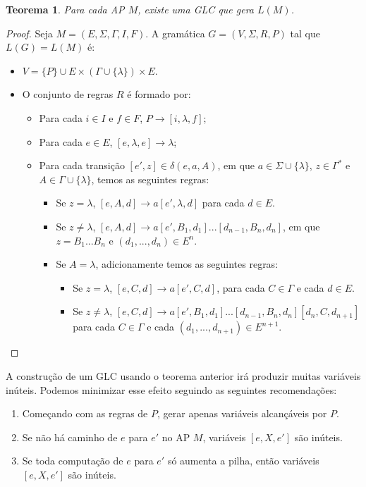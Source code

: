 \documentclass[a4paper]{article}
\newtheorem{Theorem}{Teorema}
\theoremstyle{definition}
\begin{document}
  
  \begin{Theorem}\label{thmglcap}
    Para cada AP $M$, existe uma GLC que gera $L(M)$.
  \end{Theorem}
  \begin{proof}
    Seja $M = (E,\Sigma,\Gamma,I,F)$. A gramática $G = (V,\Sigma,R,P)$ tal que
    $L(G) = L(M)$ é:
    \begin{itemize}
      \item $V = \{P\} \cup E \times (\Gamma \cup \{\lambda\}) \times E$.
      \item O conjunto de regras $R$ é formado por:
        \begin{itemize}
           \item Para cada $i \in I$ e $f \in F$, $P \to [i,\lambda,f]$;
           \item Para cada $e\in E$, $[e,\lambda,e] \to \lambda$;
           \item Para cada transição $[e',z] \in \delta(e, a, A)$, em que $a\in
             \Sigma\cup\{\lambda\}$, $z\in \Gamma^*$ e $A \in \Gamma \cup
             \{\lambda\}$, temos as seguintes regras:
             \begin{itemize}
               \item Se $z = \lambda$, $[e,A,d] \to a[e',\lambda,d]$ para cada
                 $d \in E$.
               \item Se $z\neq \lambda$, $[e,A,d] \to a[e', B_1,
                 d_1]...[d_{n-1},B_n,d_n]$, em que $z = B_1...B_n$ e
                 $(d_1,...,d_n) \in E^n$.
               \item Se $A = \lambda$, adicionamente temos as seguintes regras:
                 \begin{itemize}
                   \item Se $z = \lambda$, $[e,C,d] \to a[e',C,d]$, para cada $C \in \Gamma$ e
                     cada $d \in E$.
                   \item Se $z \neq \lambda$, $[e,C,d] \to a[e',B_1,d_1]...[d_{n
                       - 1},B_n,d_n][d_n,C,d_{n + 1}]$ para cada $C \in \Gamma$ e
                    cada $(d_1,...,d_{n+1}) \in E^{n+1}$.
                 \end{itemize}
             \end{itemize}
        \end{itemize}
    \end{itemize}
  \end{proof}

  A construção de um GLC usando o teorema anterior irá produzir muitas variáveis
  inúteis. Podemos minimizar esse efeito seguindo as seguintes recomendações:
  \begin{enumerate}
    \item Começando com as regras de $P$, gerar apenas variáveis alcançáveis por
      $P$.
    \item Se não há caminho de $e$ para $e'$ no AP $M$, variáveis $[e,X,e']$ são
      inúteis.
    \item Se toda computação de $e$ para $e'$ só aumenta a pilha, então
      variáveis $[e,X,e']$ são inúteis.
  \end{enumerate}
  
\end{document}
